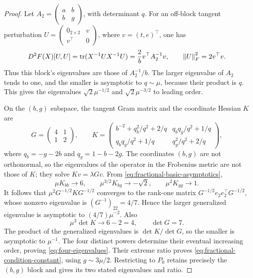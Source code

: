 \begin{proof}
Let $A_2=\begin{pmatrix}a&b\\b&g\end{pmatrix}$, with determinant
$q$. For an off-block tangent perturbation
$U=\begin{pmatrix}0_{2\times2}&v\\v^\top&0\end{pmatrix}$,
where $v=(t,e)^\top$, one has
\[
 D^2F(X)[U,U]=\operatorname{tr}(X^{-1}UX^{-1}U)
             =\frac2b v^\top A_2^{-1}v,
 \qquad \left\lVert U\right\rVert_F^2=2v^\top v.
\]
Thus this block's eigenvalues are those of $A_2^{-1}/b$.
The larger eigenvalue of $A_2$ tends to one, and the smaller is
asymptotic to $q\sim\mu$, because their product is $q$. This gives
the eigenvalues $\sqrt2\mu^{-1/2}$ and $\sqrt2\mu^{-3/2}$ to leading
order.

On the $(b,g)$ subspace, the tangent Gram matrix and the coordinate
Hessian $K$ are
\begin{equation}
 G=\begin{pmatrix}4&1\\1&2\end{pmatrix},\qquad
 K=\begin{pmatrix}
 b^{-2}+q_b^2/q^2+2/q&q_bq_g/q^2+1/q\\
 q_bq_g/q^2+1/q&q_g^2/q^2+2/q
 \end{pmatrix},
 \label{eq:fractional-generalized-block}
\end{equation}
where $q_b=-g-2b$ and $q_g=1-b-2g$. The coordinates $(b,g)$ are not
orthonormal, so the eigenvalues of the operator in the Frobenius metric
are not those of $K$; they solve $Kv=\lambda Gv$. From
\eqref{eq:fractional-basic-asymptotics},
\begin{equation}
 \mu K_{bb}\to6,\qquad
 \mu^{3/2}K_{bg}\to-\sqrt2,\qquad
 \mu^2K_{gg}\to1.
 \label{eq:fractional-block-limits}
\end{equation}
It follows that
$\mu^2G^{-1/2}KG^{-1/2}$ converges to the rank-one matrix
$G^{-1/2}e_2e_2^\top G^{-1/2}$, whose nonzero eigenvalue is
$(G^{-1})_{22}=4/7$. Hence the larger generalized eigenvalue
is asymptotic to $(4/7)\mu^{-2}$. Also
\[
 \mu^3\det K\longrightarrow6-2=4,\qquad \det G=7.
\]
The product of the generalized eigenvalues is $\det K/\det G$,
so the smaller is asymptotic to $\mu^{-1}$. The four distinct
powers determine their eventual increasing order, proving
\eqref{eq:four-eigenvalues}. Their extreme ratio proves
\eqref{eq:fractional-condition-constant}, using
$g\sim3\mu/2$. Restricting to $P_0$ retains precisely the
$(b,g)$ block and gives its two stated eigenvalues and ratio.
\end{proof}

